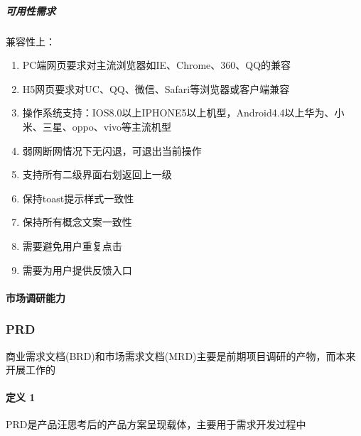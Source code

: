 \documentclass[letterpaper,10pt,english]{sphinxmanual}
\begin{document}
\subparagraph{可用性需求}
\label{\detokenize{chapter_knowledge/MRD:id9}}
兼容性上：
\begin{enumerate}
%
\item {} 
PC端网页要求对主流浏览器如IE、Chrome、360、QQ的兼容

\item {} 
H5网页要求对UC、QQ、微信、Safari等浏览器或客户端兼容%
\begin{footnote}[562]\sphinxAtStartFootnote
{}
%
\end{footnote}

\item {} 
操作系统支持：IOS8.0以上IPHONE5以上机型，Android4.4以上华为、小米、三星、oppo、vivo等主流机型

\item {} 
弱网断网情况下无闪退，可退出当前操作

\item {} 
支持所有二级界面右划返回上一级

\item {} 
保持toast提示样式一致性

\item {} 
保持所有概念文案一致性

\item {} 
需要避免用户重复点击

\item {} 
需要为用户提供反馈入口

\end{enumerate}


\paragraph{市场调研能力}
\label{\detokenize{chapter_knowledge/MRD:id10}}

\subsubsection{PRD}
\label{\detokenize{chapter_knowledge/PRD:prd}}\label{\detokenize{chapter_knowledge/PRD::doc}}
商业需求文档(BRD)和市场需求文档(MRD)主要是前期项目调研的产物，而本来开展工作的


\paragraph{定义 1\sphinxfootnotemark[563]}
\label{\detokenize{chapter_knowledge/PRD:id1}}%
\begin{footnotetext}[563]\sphinxAtStartFootnote
{}
%
\end{footnotetext}\ignorespaces 
PRD是产品汪思考后的产品方案呈现载体，主要用于需求开发过程中
\end{document}
